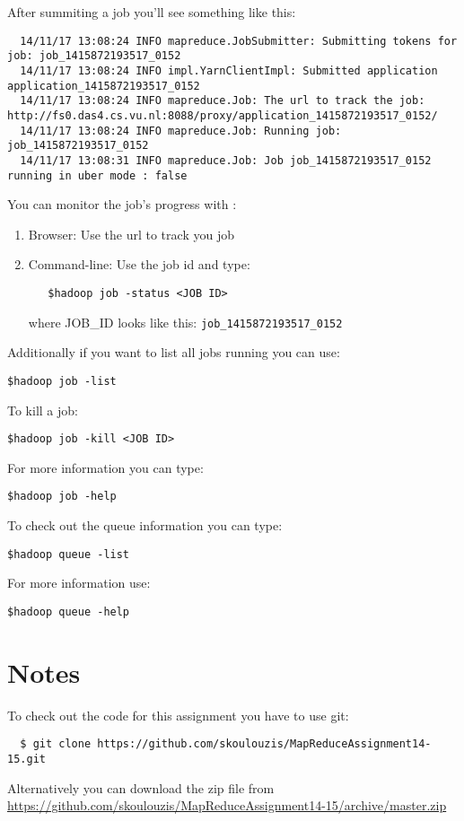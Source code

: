 \documentclass[a4paper,10pt]{article}
\begin{document}
After summiting a job you'll see something like this:

\begin{lstlisting}
  14/11/17 13:08:24 INFO mapreduce.JobSubmitter: Submitting tokens for job: job_1415872193517_0152
  14/11/17 13:08:24 INFO impl.YarnClientImpl: Submitted application application_1415872193517_0152
  14/11/17 13:08:24 INFO mapreduce.Job: The url to track the job: http://fs0.das4.cs.vu.nl:8088/proxy/application_1415872193517_0152/
  14/11/17 13:08:24 INFO mapreduce.Job: Running job: job_1415872193517_0152
  14/11/17 13:08:31 INFO mapreduce.Job: Job job_1415872193517_0152 running in uber mode : false
\end{lstlisting}

You can monitor the job's progress with :

\begin{enumerate}
  \item Browser: Use the url to track you job
  
  \item Command-line: Use the job id and type:
  \begin{lstlisting}
   $hadoop job -status <JOB ID>
  \end{lstlisting}
  
  where JOB\_ID looks like this: \texttt{job\_1415872193517\_0152}
\end{enumerate}

Additionally if you want to list all jobs running you can use:
\begin{lstlisting}
$hadoop job -list
\end{lstlisting}

To kill a job:

\begin{lstlisting}
$hadoop job -kill <JOB ID>
\end{lstlisting}

For more information you can type:
\begin{lstlisting}
$hadoop job -help
\end{lstlisting}


To check out the queue information you can type:

\begin{lstlisting}
$hadoop queue -list
\end{lstlisting}

For more information use:
\begin{lstlisting}
$hadoop queue -help
\end{lstlisting}



\section{Notes}
To check out the code for this assignment you have to use git:
\begin{lstlisting}
  $ git clone https://github.com/skoulouzis/MapReduceAssignment14-15.git
\end{lstlisting}

Alternatively you can download the zip file from \url{https://github.com/skoulouzis/MapReduceAssignment14-15/archive/master.zip}
\end{document}

